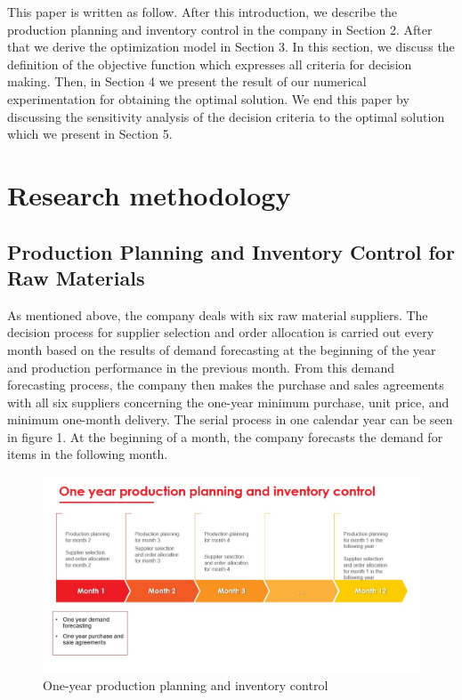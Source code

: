 \documentclass[preprint, 3p,
authoryear]{elsarticle} %
\begin{document}
This paper is written as follow. After this introduction, we describe
the production planning and inventory control in the company in Section
2. After that we derive the optimization model in Section 3. In this
section, we discuss the definition of the objective function which
expresses all criteria for decision making. Then, in Section 4 we
present the result of our numerical experimentation for obtaining the
optimal solution. We end this paper by discussing the sensitivity
analysis of the decision criteria to the optimal solution which we
present in Section 5.

\hypertarget{research-methodology}{%
\section{Research methodology}\label{research-methodology}}

\hypertarget{production-planning-and-inventory-control-for-raw-materials}{%
\subsection{Production Planning and Inventory Control for Raw
Materials}\label{production-planning-and-inventory-control-for-raw-materials}}

As mentioned above, the company deals with six raw material suppliers.
The decision process for supplier selection and order allocation is
carried out every month based on the results of demand forecasting at
the beginning of the year and production performance in the previous
month. From this demand forecasting process, the company then makes the
purchase and sales agreements with all six suppliers concerning the
one-year minimum purchase, unit price, and minimum one-month delivery.
The serial process in one calendar year can be seen in figure 1. At the
beginning of a month, the company forecasts the demand for items in the
following month.

\begin{figure}

{\centering \includegraphics[width=0.8\linewidth]{production planning and inventory control} 

}

\caption{One-year production planning and inventory control}\label{fig:unnamed-chunk-1}
\end{figure}
\end{document}
